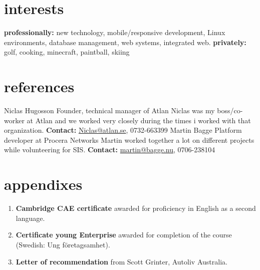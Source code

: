 \documentclass[]{friggeri-cv} %
\begin{document}

\section{interests}

\textbf{professionally:} new technology, mobile/responsive development, Linux environments, database management, web systems, integrated web. \textbf{privately:} golf, cooking, minecraft, paintball, skiing


\section{references}
\begin{entrylist}
	\entry
	{}
	{Niclas Hugosson}
	{Founder, technical manager of Atlan}
	{Niclas was my boss/co-worker at Atlan and we worked very closely during the times i worked with that organization. \textbf{Contact:} \href{mailto:niclas@atlan.se}{Niclas@atlan.se}, 0732-663399}
	\entry
	{}
	{Martin Bagge}
	{Platform developer at Procera Networks}
	{Martin worked together a lot on different projects while volunteering for SIS. \textbf{Contact:} \href{mailto:martin@bagge.nu}{martin@bagge.nu}, 0706-238104 }
\end{entrylist}




\section{appendixes}
\begin{enumerate}
	\item \textbf{Cambridge CAE certificate} awarded for proficiency in English as a second language.
	\item \textbf{Certificate young Enterprise} awarded for completion of the course (Swedish: Ung företagsamhet).
	\item \textbf{Letter of recommendation} from Scott Grinter, Autoliv Australia.
\end{enumerate}
\newpage
\appendix




\end{document}
